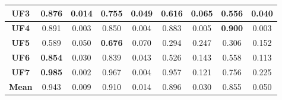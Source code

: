 \begin{table*}[t]
\begin{tabular}{cc|c|c|c|c|c|c|c}
\multicolumn{1}{c|}{\textbf{UF3}}   & \multicolumn{1}{c|}{\textbf{0.876}} & 0.014        & 0.755             & 0.049           & 0.616              & 0.065           & 0.556              & 0.040            \\ \hline
\multicolumn{1}{c|}{\textbf{UF4}}   & \multicolumn{1}{c|}{0.891}          & 0.003        & 0.850             & 0.004           & 0.883              & 0.005           & \textbf{0.900}     & 0.003            \\ \hline
\multicolumn{1}{c|}{\textbf{UF5}}   & \multicolumn{1}{c|}{0.589}          & 0.050        & \textbf{0.676}    & 0.070           & 0.294              & 0.247           & 0.306              & 0.152            \\ \hline
\multicolumn{1}{c|}{\textbf{UF6}}   & \multicolumn{1}{c|}{\textbf{0.854}} & 0.030        & 0.839             & 0.043           & 0.526              & 0.143           & 0.558              & 0.113            \\ \hline
\multicolumn{1}{c|}{\textbf{UF7}}   & \multicolumn{1}{c|}{\textbf{0.985}} & 0.002        & 0.967             & 0.004           & 0.957              & 0.121           & 0.756              & 0.225            \\ \hline
\multicolumn{1}{c|}{\textbf{Mean}}  & \multicolumn{1}{c|}{0.943}          & 0.009        & 0.910             & 0.014           & 0.896              & 0.030           & 0.855              & 0.050            \\ \hline
\end{tabular}%
\end{table*}
